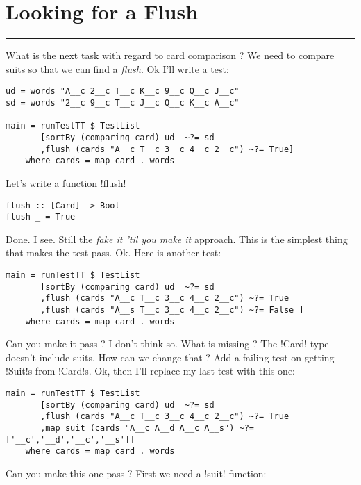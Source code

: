 \newpage
\section{Looking for a Flush} %
\vspace{10cm}
\hrule

\lhQ What is the next task with regard to card comparison ?
\lhA We need to compare suits so that we can find a \emph{flush}.
\lhN Ok I'll write a test:
\begin{lstlisting}[frame=single]
ud = words "A__c 2__c T__c K__c 9__c Q__c J__c"
sd = words "2__c 9__c T__c J__c Q__c K__c A__c"

main = runTestTT $ TestList 
       [sortBy (comparing card) ud  ~?= sd
       ,flush (cards "A__c T__c 3__c 4__c 2__c") ~?= True]
    where cards = map card . words
\end{lstlisting} %
\hspace*{\fill}
\lhA \error Let's write a function \il!flush!
\begin{lstlisting}[frame=single]
flush :: [Card] -> Bool
flush _ = True
\end{lstlisting}
\success Done.
\lhN I see. Still the \emph{fake it 'til you make it} approach.
\lhA This is the simplest thing that makes the test pass.
\lhN Ok. Here is another test:
\begin{lstlisting}[frame=single]
main = runTestTT $ TestList 
       [sortBy (comparing card) ud  ~?= sd
       ,flush (cards "A__c T__c 3__c 4__c 2__c") ~?= True
       ,flush (cards "A__s T__c 3__c 4__c 2__c") ~?= False ]
    where cards = map card . words
\end{lstlisting} %
Can you make it pass ?
\lhA \failure I don't think so.
\lhN What is missing ?
\lhA The \il!Card! type doesn't include suits.
\lhN How can we change that ?
\lhA Add a failing test on getting \il!Suit!s from \il!Card!s.
\lhN Ok, then I'll replace my last test with this one:
\begin{lstlisting}[frame=single]
main = runTestTT $ TestList 
       [sortBy (comparing card) ud  ~?= sd
       ,flush (cards "A__c T__c 3__c 4__c 2__c") ~?= True
       ,map suit (cards "A__c A__d A__c A__s") ~?= ['__c','__d','__c','__s']]
    where cards = map card . words
\end{lstlisting} %
Can you make this one pass ?  
\lhA \error First we need a \il!suit! function:
